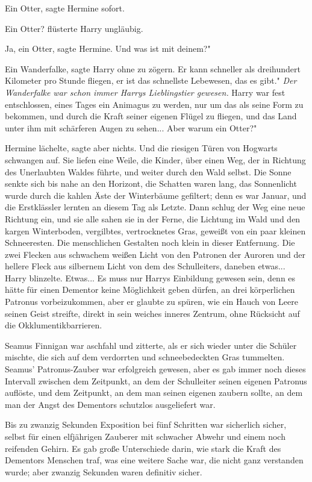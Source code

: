 \glqq{}Ein Otter\grqq{}, sagte Hermine sofort.

\glqq{}Ein Otter?\grqq{} flüsterte Harry ungläubig.

\glqq{}Ja, ein Otter\grqq{}, sagte Hermine. \glqq{}Und was ist mit deinem?"

\glqq{}Ein Wanderfalke\grqq{}, sagte Harry ohne zu zögern. \glqq{}Er kann
schneller als dreihundert Kilometer pro Stunde fliegen, er ist das schnellste
Lebewesen, das es gibt."
\emph{Der Wanderfalke war schon immer Harrys Lieblingstier gewesen.}
Harry war fest entschlossen, eines Tages ein Animagus zu werden, nur um das als
seine Form zu bekommen, und durch die Kraft seiner eigenen Flügel zu fliegen,
und das Land unter ihm mit schärferen Augen zu sehen... \glqq{}Aber warum ein
Otter?"

Hermine lächelte, sagte aber nichts. Und die riesigen Türen von Hogwarts
schwangen auf. Sie liefen eine Weile, die Kinder, über einen Weg, der in
Richtung des Unerlaubten Waldes führte, und weiter durch den Wald selbst. Die
Sonne senkte sich bis nahe an den Horizont, die Schatten waren lang, das
Sonnenlicht wurde durch die kahlen Äste der Winterbäume gefiltert; denn es war
Januar, und die Erstklässler lernten an diesem Tag als Letzte. Dann schlug der
Weg eine neue Richtung ein, und sie alle sahen sie in der Ferne, die Lichtung im
Wald und den kargen Winterboden, vergilbtes, vertrocknetes Gras, geweißt von ein
paar kleinen Schneeresten. Die menschlichen Gestalten noch klein in dieser
Entfernung. Die zwei Flecken aus schwachem weißen Licht von den Patronen der
Auroren und der hellere Fleck aus silbernem Licht von dem des Schulleiters,
daneben etwas... Harry blinzelte. Etwas... Es muss nur Harrys Einbildung gewesen
sein, denn es hätte für einen Dementor keine Möglichkeit geben dürfen, an drei
körperlichen Patronus vorbeizukommen, aber er glaubte zu spüren, wie ein Hauch
von Leere seinen Geist streifte, direkt in sein weiches inneres Zentrum, ohne
Rücksicht auf die Okklumentikbarrieren.

Seamus Finnigan war aschfahl und zitterte, als er sich wieder unter die Schüler
mischte, die sich auf dem verdorrten und schneebedeckten Gras tummelten. Seamus'
Patronus-Zauber war erfolgreich gewesen, aber es gab immer noch dieses Intervall
zwischen dem Zeitpunkt, an dem der Schulleiter seinen eigenen Patronus auflöste,
und dem Zeitpunkt, an dem man seinen eigenen zaubern sollte, an dem man der
Angst des Dementors schutzlos ausgeliefert war.

Bis zu zwanzig Sekunden Exposition bei fünf Schritten war sicherlich sicher,
selbst für einen elfjährigen Zauberer mit schwacher Abwehr und einem noch
reifenden Gehirn. Es gab große Unterschiede darin, wie stark die Kraft des
Dementors Menschen traf, was eine weitere Sache war, die nicht ganz verstanden
wurde; aber zwanzig Sekunden waren definitiv sicher.

